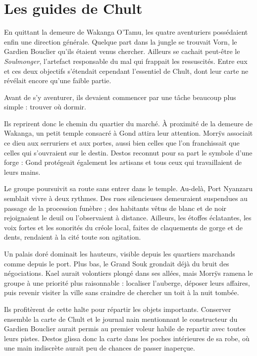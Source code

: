 \chapter{Les guides de Chult}


En quittant la demeure de Wakanga O'Tamu, les quatre aventuriers possédaient enfin une direction générale. Quelque part dans la jungle se trouvait Vorn, le Gardien Bouclier qu'ils étaient venus chercher. Ailleurs se cachait peut-être le \textit{Soulmonger}, l'artefact responsable du mal qui frappait les ressuscités. Entre eux et ces deux objectifs s'étendait cependant l'essentiel de Chult, dont leur carte ne révélait encore qu'une faible partie.

Avant de s'y aventurer, ils devaient commencer par une tâche beaucoup plus simple : trouver où dormir.

Ils reprirent donc le chemin du quartier du marché. À proximité de la demeure de Wakanga, un petit temple consacré à Gond attira leur attention. Morrÿs associait ce dieu aux serruriers et aux portes, aussi bien celles que l'on franchissait que celles qui s'ouvraient sur le destin. Destos reconnut pour sa part le symbole d'une forge : Gond protégeait également les artisans et tous ceux qui travaillaient de leurs mains.

Le groupe poursuivit sa route sans entrer dans le temple. Au-delà, Port Nyanzaru semblait vivre à deux rythmes. Des rues silencieuses demeuraient suspendues au passage de la procession funèbre ; des habitants vêtus de blanc et de noir rejoignaient le deuil ou l'observaient à distance. Ailleurs, les étoffes éclatantes, les voix fortes et les sonorités du créole local, faites de claquements de gorge et de dents, rendaient à la cité toute son agitation.

Un palais doré dominait les hauteurs, visible depuis les quartiers marchands comme depuis le port. Plus bas, le Grand Souk grondait déjà du bruit des négociations. Kael aurait volontiers plongé dans ses allées, mais Morrÿs ramena le groupe à une priorité plus raisonnable : localiser l'auberge, déposer leurs affaires, puis revenir visiter la ville sans craindre de chercher un toit à la nuit tombée.

Ils profitèrent de cette halte pour répartir les objets importants. Conserver ensemble la carte de Chult et le journal nain mentionnant le constructeur du Gardien Bouclier aurait permis au premier voleur habile de repartir avec toutes leurs pistes. Destos glissa donc la carte dans les poches intérieures de sa robe, où une main indiscrète aurait peu de chances de passer inaperçue.

